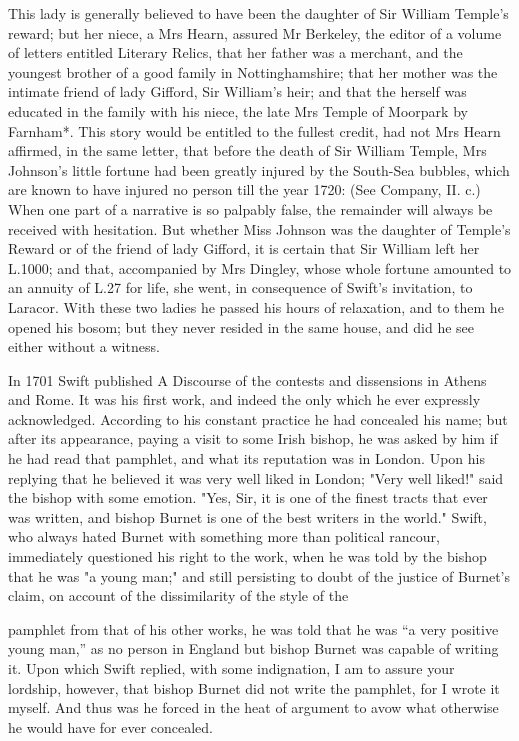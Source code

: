 \documentclass{article}
\begin{document}
This lady is generally believed to have been the daughter of Sir William Temple's reward; but her niece, a Mrs Hearn, assured Mr Berkeley, the editor of a volume of letters entitled Literary Relics, that her father was a merchant, and the youngest brother of a good family in Nottinghamshire; that her mother was the intimate friend of lady Gifford, Sir William's heir; and that the herself was educated in the family with his niece, the late Mrs Temple of Moorpark by Farnham*. This story would be entitled to the fullest credit, had not Mrs Hearn affirmed, in the same letter, that before the death of Sir William Temple, Mrs Johnson's little fortune had been greatly injured by the South-Sea bubbles, which are known to have injured no person till the year 1720: (See Company, II. c.) When one part of a narrative is so palpably false, the remainder will always be received with hesitation. But whether Miss Johnson was the daughter of Temple's Reward or of the friend of lady Gifford, it is certain that Sir William left her L.1000; and that, accompanied by Mrs Dingley, whose whole fortune amounted to an annuity of L.27 for life, she went, in consequence of Swift's invitation, to Laracor. With these two ladies he passed his hours of relaxation, and to them he opened his bosom; but they never resided in the same house, and did he see either without a witness.

In 1701 Swift published A Discourse of the contests and dissensions in Athens and Rome. It was his first work, and indeed the only which he ever expressly acknowledged. According to his constant practice he had concealed his name; but after its appearance, paying a visit to some Irish bishop, he was asked by him if he had read that pamphlet, and what its reputation was in London. Upon his replying that he believed it was very well liked in London; "Very well liked!" said the bishop with some emotion. "Yes, Sir, it is one of the finest tracts that ever was written, and bishop Burnet is one of the best writers in the world." Swift, who always hated Burnet with something more than political rancour, immediately questioned his right to the work, when he was told by the bishop that he was "a young man;" and still persisting to doubt of the justice of Burnet's claim, on account of the dissimilarity of the style of the

pamphlet from that of his other works, he was told that he was “a very positive young man,” as no person in England but bishop Burnet was capable of writing it. Upon which Swift replied, with some indignation, I am to assure your lordship, however, that bishop Burnet did not write the pamphlet, for I wrote it myself. And thus was he forced in the heat of argument to avow what otherwise he would have for ever concealed.
\end{document}
